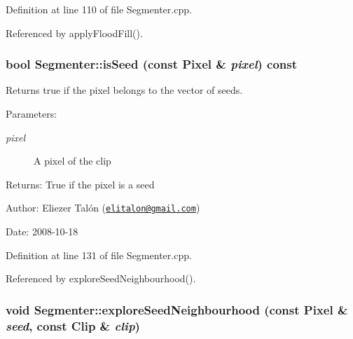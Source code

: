 Definition at line 110 of file Segmenter.cpp.

Referenced by applyFloodFill().\hypertarget{class_segmenter_eb86d455481f794cb4870eba98ee4340}{
\subsubsection[isSeed]{\setlength{\rightskip}{0pt plus 5cm}bool Segmenter::isSeed (const {\bf Pixel} \& {\em pixel}) const}}
\label{class_segmenter_eb86d455481f794cb4870eba98ee4340}


Returns true if the pixel belongs to the vector of seeds. 

\begin{Desc}
\item[Parameters:]
\begin{description}
\item[{\em pixel}]A pixel of the clip\end{description}
\end{Desc}
\begin{Desc}
\item[Returns:]True if the pixel is a seed\end{Desc}
\begin{Desc}
\item[Author:]Eliezer Talón (\href{mailto:elitalon@gmail.com}{\tt elitalon@gmail.com}) \end{Desc}
\begin{Desc}
\item[Date:]2008-10-18 \end{Desc}


Definition at line 131 of file Segmenter.cpp.

Referenced by exploreSeedNeighbourhood().\hypertarget{class_segmenter_684df74b0e810a837669823c47b6ed87}{
\subsubsection[exploreSeedNeighbourhood]{\setlength{\rightskip}{0pt plus 5cm}void Segmenter::exploreSeedNeighbourhood (const {\bf Pixel} \& {\em seed}, \/  const {\bf Clip} \& {\em clip})}}
\label{class_segmenter_684df74b0e810a837669823c47b6ed87}



